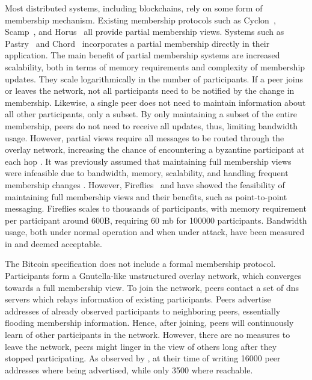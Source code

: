 \documentclass[USenglish]{uit-thesis}
\begin{document}


Most distributed systems, including blockchains, rely on some form of membership mechanism.
Existing membership protocols such as Cyclon~\cite{cyclon}, Scamp~\cite{scamp}, and Horus~\cite{horus} all provide partial membership views.
Systems such as Pastry~\cite{pastry} and Chord~\cite{chord} incorporates a partial membership directly in their application.
The main benefit of partial membership systems are increased scalability, both in terms of memory requirements and complexity of membership updates.
They scale logarithmically in the number of participants.
If a peer joins or leaves the network, not all participants need to be notified by the change in membership.
Likewise, a single peer does not need to maintain information about all other participants, only a subset.
By only maintaining a subset of the entire membership, peers do not need to receive all updates, thus, limiting bandwidth usage.
However, partial views require all messages to be routed through the overlay network, increasing the chance of encountering a byzantine participant at each hop \cite{onehop}.
It was previously assumed that maintaining full membership views were infeasible due to bandwidth, memory, scalability, and handling frequent membership changes \cite{p2pmem}.
However, Fireflies~\cite{flies, flies2} and \cite{onehop} have showed the feasibility of maintaining full membership views and their benefits, such as point-to-point messaging.
Fireflies scales to thousands of participants, with memory requirement per participant around 600B, requiring 60 \gls{mb} for 100000 participants.
Bandwidth usage, both under normal operation and when under attack, have been measured in \cite{flies} and deemed acceptable.
 
 
The Bitcoin specification \cite{bitcoin} does not include a formal membership protocol. 
Participants form a Gnutella-like \cite{gnutella, havard1} unstructured overlay network, which converges towards a full membership view.
To join the network, peers contact a set of \gls{dns} servers which relays information of existing participants.
Peers advertise addresses of already observed participants to neighboring peers, essentially flooding membership information.
Hence, after joining, peers will continuously learn of other participants in the network.   
However, there are no measures to leave the network, peers might linger in the view of others long after they stopped participating.
As observed by \cite{propa}, at their time of writing 16000 peer addresses where being advertised, while only 3500 where reachable.
\end{document}
